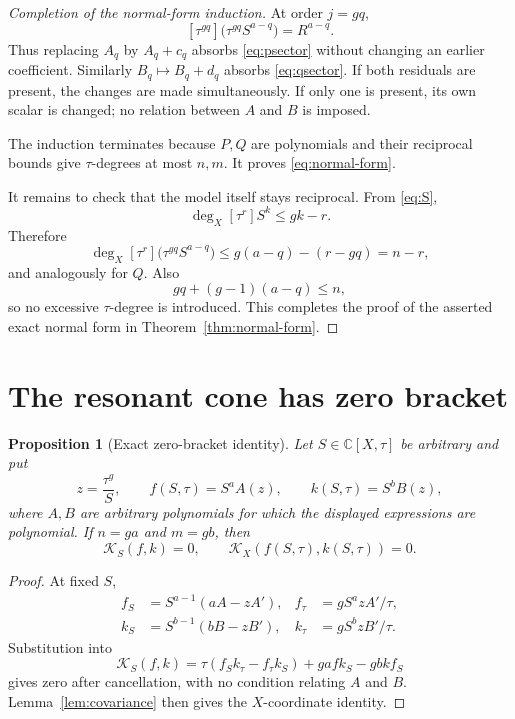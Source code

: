 \documentclass[11pt]{article}
\newtheorem{proposition}[theorem]{Proposition}
\theoremstyle{definition}
\theoremstyle{remark}
\newcommand{\C}{\mathbb C}
\newcommand{\KX}{\mathcal K_X}
\newcommand{\KS}{\mathcal K_S}
\begin{document}
\begin{proof}[Completion of the normal-form induction]
At order \(j=gq\),
\[
 [\tau^{gq}]
 \bigl(\tau^{gq}S^{a-q}\bigr)=R^{a-q}.
\]
Thus replacing \(A_q\) by \(A_q+c_q\) absorbs
\eqref{eq:psector} without changing an earlier coefficient.  Similarly
\(B_q\mapsto B_q+d_q\) absorbs \eqref{eq:qsector}.  If both residuals
are present, the changes are made simultaneously.  If only one is
present, its own scalar is changed; no relation between \(A\) and \(B\)
is imposed.

The induction terminates because \(P,Q\) are polynomials and their
reciprocal bounds give \(\tau\)-degrees at most \(n,m\).  It proves
\eqref{eq:normal-form}.

It remains to check that the model itself stays reciprocal.  From
\eqref{eq:S},
\[
 \deg_X[\tau^r]S^k\leq gk-r.
\]
Therefore
\[
 \deg_X[\tau^r]
 \bigl(\tau^{gq}S^{a-q}\bigr)
 \leq g(a-q)-(r-gq)=n-r,
\]
and analogously for \(Q\).  Also
\[
 gq+(g-1)(a-q)\leq n,
\]
so no excessive \(\tau\)-degree is introduced.  This completes the
proof of the asserted exact normal form in
Theorem~\ref{thm:normal-form}.
\end{proof}

\section{The resonant cone has zero bracket}
\label{sec:zero}

\begin{proposition}[Exact zero-bracket identity]
\label{prop:zero}
Let \(S\in\C[X,\tau]\) be arbitrary and put
\[
 z=\frac{\tau^g}{S},\qquad
 f(S,\tau)=S^aA(z),\qquad
 k(S,\tau)=S^bB(z),
\]
where \(A,B\) are arbitrary polynomials for which the displayed
expressions are polynomial.  If \(n=ga\) and \(m=gb\), then
\[
 \KS(f,k)=0,\qquad \KX(f(S,\tau),k(S,\tau))=0.
\]
\end{proposition}

\begin{proof}
At fixed \(S\),
\[
\begin{aligned}
 f_S&=S^{a-1}(aA-zA'),&
 f_\tau&=gS^azA'/\tau,\\
 k_S&=S^{b-1}(bB-zB'),&
 k_\tau&=gS^bzB'/\tau.
\end{aligned}
\]
Substitution into
\[
 \KS(f,k)
 =\tau(f_Sk_\tau-f_\tau k_S)+gafk_S-gbkf_S
\]
gives zero after cancellation, with no condition relating \(A\) and
\(B\).  Lemma~\ref{lem:covariance} then gives the \(X\)-coordinate
identity.
\end{proof}
\end{document}
